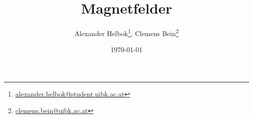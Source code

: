 \thispagestyle{empty}
\titlehead{\texttt{[image: logo.jpg]}}
\title{Magnetfelder}
\author{Alexander Helbok\thanks{\href{mailto:alexander.helbok@student.uibk.ac.at}{alexander.helbok@student.uibk.ac.at}}, Clemens Bein\thanks{\href{mailto:clemens.bein@uibk.ac.at}{clemens.bein@uibk.ac.at}}}
\date{\today}
\maketitle
\vfill 